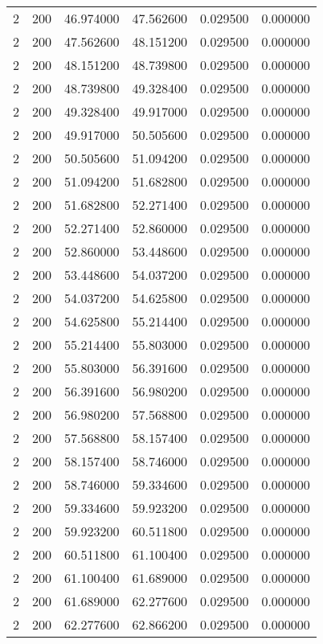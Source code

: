 \begin{longtable}{rrrrrr}
2 & 200 & 46.974000 & 47.562600 & 0.029500 & 0.000000 \\
2 & 200 & 47.562600 & 48.151200 & 0.029500 & 0.000000 \\
2 & 200 & 48.151200 & 48.739800 & 0.029500 & 0.000000 \\
2 & 200 & 48.739800 & 49.328400 & 0.029500 & 0.000000 \\
2 & 200 & 49.328400 & 49.917000 & 0.029500 & 0.000000 \\
2 & 200 & 49.917000 & 50.505600 & 0.029500 & 0.000000 \\
2 & 200 & 50.505600 & 51.094200 & 0.029500 & 0.000000 \\
2 & 200 & 51.094200 & 51.682800 & 0.029500 & 0.000000 \\
2 & 200 & 51.682800 & 52.271400 & 0.029500 & 0.000000 \\
2 & 200 & 52.271400 & 52.860000 & 0.029500 & 0.000000 \\
2 & 200 & 52.860000 & 53.448600 & 0.029500 & 0.000000 \\
2 & 200 & 53.448600 & 54.037200 & 0.029500 & 0.000000 \\
2 & 200 & 54.037200 & 54.625800 & 0.029500 & 0.000000 \\
2 & 200 & 54.625800 & 55.214400 & 0.029500 & 0.000000 \\
2 & 200 & 55.214400 & 55.803000 & 0.029500 & 0.000000 \\
2 & 200 & 55.803000 & 56.391600 & 0.029500 & 0.000000 \\
2 & 200 & 56.391600 & 56.980200 & 0.029500 & 0.000000 \\
2 & 200 & 56.980200 & 57.568800 & 0.029500 & 0.000000 \\
2 & 200 & 57.568800 & 58.157400 & 0.029500 & 0.000000 \\
2 & 200 & 58.157400 & 58.746000 & 0.029500 & 0.000000 \\
2 & 200 & 58.746000 & 59.334600 & 0.029500 & 0.000000 \\
2 & 200 & 59.334600 & 59.923200 & 0.029500 & 0.000000 \\
2 & 200 & 59.923200 & 60.511800 & 0.029500 & 0.000000 \\
2 & 200 & 60.511800 & 61.100400 & 0.029500 & 0.000000 \\
2 & 200 & 61.100400 & 61.689000 & 0.029500 & 0.000000 \\
2 & 200 & 61.689000 & 62.277600 & 0.029500 & 0.000000 \\
2 & 200 & 62.277600 & 62.866200 & 0.029500 & 0.000000 \\

\end{longtable}
